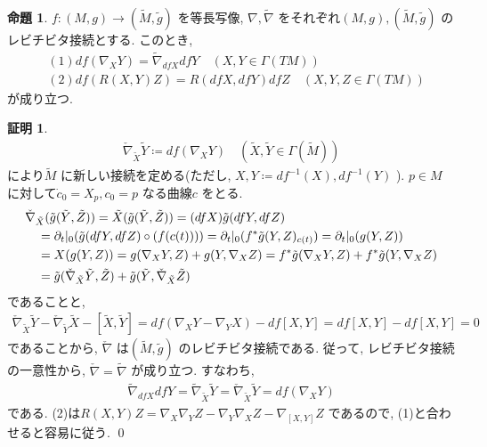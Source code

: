 \documentclass[twocolumn, landscape, a4paper , 8pt, fleqn, titlepage ]{jsarticle}
\theoremstyle{definition}
\newtheorem{prop}[dfn]{命題}
\newtheorem*{pf*}{証明}
\newcommand{\paren}[1]{\mleft( #1\mright )}
\begin{document}
\begin{prop}
$f: (M,g) \rightarrow (\tilde M, \tilde g)$ を等長写像, $\nabla, \tilde \nabla$ をそれぞれ$(M, g), (\tilde M, \tilde g)$ のレビチビタ接続とする. このとき, 
\begin{align*} &(1)df(\nabla_X Y ) = \tilde \nabla _{dfX} dfY \quad (X, Y \in \Gamma (TM)) \\&(2) df(R(X,Y)Z) = R(dfX,dfY)dfZ \quad (X,Y,Z \in \Gamma(TM) ) \end{align*}
が成り立つ. 
\end{prop}
\begin{pf*}
\begin{align*} \check \nabla _{\tilde X} \tilde Y \coloneqq df(\nabla_X Y) \quad (\tilde X, \tilde Y \in \Gamma(\tilde M) ) \end{align*}
により$\tilde M$ に新しい接続を定める(ただし, $X, Y \coloneqq df^{-1} (X), df^{-1} (Y) $ ).  $p \in M$ に対して$\dot c_0 = X_p , c_0 = p$ なる曲線$c$ をとる. 
\begin{align*} &\check{\nabla}_{\tilde X} (\tilde g (\tilde Y, \tilde Z)) = \tilde X (\tilde g (\tilde Y, \tilde Z)) = (dfX) \tilde g (dfY, dfZ) \\
& \quad = \partial_t|_0 \paren{\tilde g (dfY, dfZ) \circ (f(c(t))) } = \partial_t | _0 (f^* \tilde g (Y,Z) _{c(t)}) = \partial_t |_0 (g(Y,Z)) \\
&\quad = X(g(Y,Z)) = g(\nabla_X Y, Z ) + g(Y, \nabla_X Z) = f^* \tilde g (\nabla_X Y, Z)+ f^* \tilde g (Y, \nabla_X Z) \\& \quad = \tilde g (\check{\nabla}_{\tilde X} \tilde Y, \tilde Z) + \tilde g (\tilde Y, \check{\nabla}_{\tilde X} \tilde Z)  \end{align*}
であることと, 
\begin{align*} \check{\nabla} _{\tilde X} \tilde Y -  \check{\nabla} _{\tilde Y} \tilde X -  [\tilde X, \tilde Y] = df(\nabla_X Y - \nabla_Y X) - df[X,Y] = df[X,Y] - df[X,Y] = 0\end{align*}
であることから, $\check \nabla$ は$(\tilde M , \tilde g)$ のレビチビタ接続である. 従って, レビチビタ接続の一意性から, $\check \nabla = \tilde \nabla$ が成り立つ. すなわち, 
\begin{align*} \tilde{\nabla}_{dfX} dfY =  \tilde{\nabla}_{\tilde X} \tilde Y = \check{\nabla}_{\tilde X} \tilde Y = df(\nabla_X Y) \end{align*}
である. (2)は$R(X,Y)Z = \nabla_X \nabla_Y Z - \nabla_Y \nabla_X Z - \nabla_{[X,Y]}Z$ であるので, (1)と合わせると容易に従う. 
\qed
\end{pf*}
\end{document}
